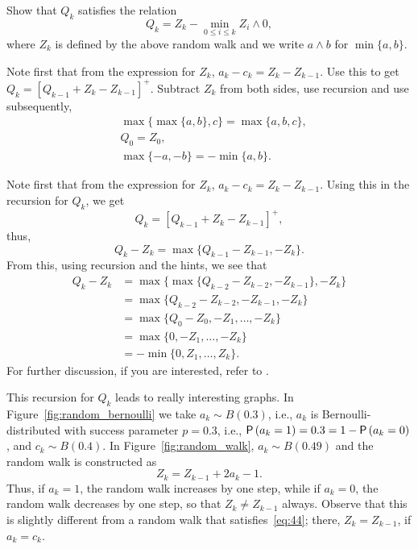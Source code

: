 \begin{exercise}
Show that  $Q_k$ satisfies the relation
\begin{equation}\label{eq:reich1}
  Q_k = Z_k - \min_{0\leq i \leq k} Z_i\wedge 0,
\end{equation}
where $Z_k$ is defined by the above random walk and
we write $a\wedge b$ for $\min\{a,b\}$.
\begin{hint}
Note first that from the expression for $Z_k$,
  $a_k - c_k = Z_k - Z_{k-1}$. Use this to get
  $Q_k = [Q_{k-1} +Z_k- Z_{k-1}]^+$. Subtract $Z_k$ from both sides, use recursion and
  use subsequently,
\begin{align*}
&\max\{\max\{a,b\}, c\} = \max\{a,b,c\}, \\
&Q_0 = Z_0, \\
&\max\{-a, -b \} = -\min\{a,b\}.
\end{align*}
\end{hint}
\begin{solution}
Note first that from the expression
for $Z_k$, $a_k - c_k = Z_k - Z_{k-1}$. Using this in the recursion
for $Q_k$, we get
\begin{equation*}
  Q_k = [Q_{k-1} +Z_k- Z_{k-1}]^+,
\end{equation*}
thus, 
\begin{equation*}
  Q_k - Z_{k} = \max\{Q_{k-1} - Z_{k-1}, -Z_k\}.
\end{equation*}
From this, using recursion and the hints, we see that
\begin{equation*}
  \begin{split}
  Q_k - Z_{k} 
&= \max\{\max\{Q_{k-2} - Z_{k-2}, -Z_{k-1}\}, -Z_k\} \\
&= \max\{Q_{k-2} - Z_{k-2}, -Z_{k-1}, -Z_k\} \\
&= \max\{Q_{0} - Z_{0}, -Z_1, \ldots, -Z_k\} \\
&= \max\{0, -Z_1, \ldots, -Z_k\} \\
&= - \min\{0, Z_1, \ldots, Z_k\}.
  \end{split}
  \end{equation*}
For further discussion, if you are interested, refer to
  \citet{baccelli88:_sampl_m_m}.
\end{solution}
\end{exercise}

This recursion for $Q_k$ leads to really interesting graphs. In Figure~\ref{fig:random_bernoulli}
 we take $a_k \sim B(0.3)$, i.e., $a_k$ is Bernoulli-distributed with success
parameter $p=0.3$, i.e., $\P{a_k = 1} = 0.3 = 1- \P{a_k=0}$, and
$c_k \sim B(0.4)$. In Figure~\ref{fig:random_walk},  $a_k\sim B(0.49)$ and
the random walk is constructed as
\begin{equation}\label{eq:51}
  Z_k = Z_{k-1} + 2 a_k -1.
\end{equation}
Thus, if $a_k=1$, the random walk increases by one step, while if $a_k=0$, the random walk decreases by one step, so that $Z_k \neq Z_{k-1}$  always. Observe that this is slightly different from a random walk that satisfies~\eqref{eq:44}; there, $Z_{k}=Z_{k-1}$, if $a_k=c_k$.


